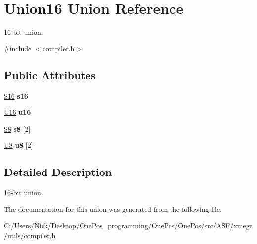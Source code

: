 \hypertarget{union_union16}{\section{Union16 Union Reference}
\label{union_union16}
}


16-\/bit union.  




{\ttfamily \#include $<$compiler.\-h$>$}

\subsection*{Public Attributes}
\begin{DoxyCompactItemize}
\item 
\hypertarget{union_union16_afefdb4bb60d553b514dc939a77ed454f}{\hyperlink{group__group__xmega__utils_ga6d241ad21a823c90d4835380787db5d4}{S16} {\bfseries s16}}\label{union_union16_afefdb4bb60d553b514dc939a77ed454f}

\item 
\hypertarget{union_union16_a1d8ea8e71644d08735c240bca057ba72}{\hyperlink{group__group__xmega__utils_ga0a0a322d5fa4a546d293a77ba8b4a71f}{U16} {\bfseries u16}}\label{union_union16_a1d8ea8e71644d08735c240bca057ba72}

\item 
\hypertarget{union_union16_a65da903c0884ad6d9645a077e0fc3635}{\hyperlink{group__group__xmega__utils_gaf1475a0bb1962ef08dd1f78bd5dba87a}{S8} {\bfseries s8} \mbox{[}2\mbox{]}}\label{union_union16_a65da903c0884ad6d9645a077e0fc3635}

\item 
\hypertarget{union_union16_a51b422bf4eea40dcdf0b9162401d8f9c}{\hyperlink{group__group__xmega__utils_gaa63ef7b996d5487ce35a5a66601f3e73}{U8} {\bfseries u8} \mbox{[}2\mbox{]}}\label{union_union16_a51b422bf4eea40dcdf0b9162401d8f9c}

\end{DoxyCompactItemize}


\subsection{Detailed Description}
16-\/bit union. 

The documentation for this union was generated from the following file\-:\begin{DoxyCompactItemize}
\item 
C\-:/\-Users/\-Nick/\-Desktop/\-One\-Pos\-\_\-programming/\-One\-Pos/\-One\-Pos/src/\-A\-S\-F/xmega/utils/\hyperlink{compiler_8h}{compiler.\-h}\end{DoxyCompactItemize}

